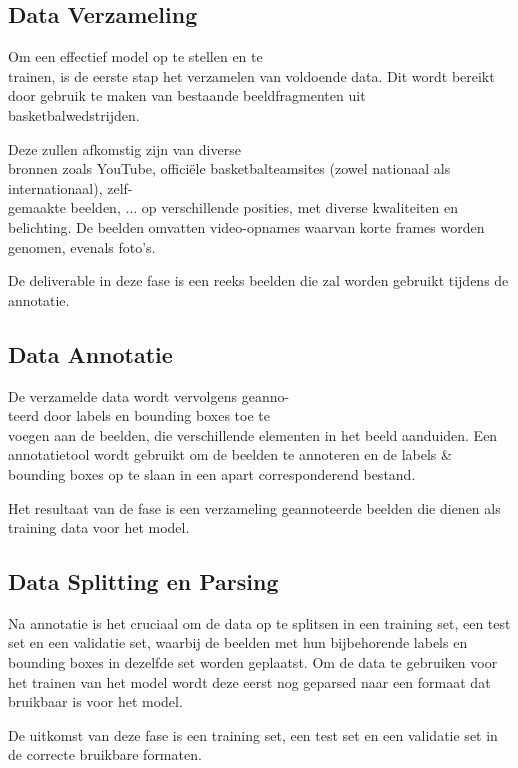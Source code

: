 \subsection{Data Verzameling}
Om een effectief model op te stellen en te \\trainen, is de eerste stap het verzamelen van voldoende data. 
Dit wordt bereikt door gebruik te maken van bestaande beeldfragmenten uit \\basketbalwedstrijden.

Deze zullen afkomstig zijn van diverse \\bronnen zoals YouTube, officiële basketbalteamsites (zowel nationaal als internationaal), zelf-\\gemaakte beelden, $\ldots$ op verschillende posities, met diverse kwaliteiten en belichting. 
De beelden omvatten video-opnames waarvan korte frames worden genomen, evenals foto's.

De deliverable in deze fase is een reeks beelden die zal worden gebruikt tijdens de annotatie.


\subsection{Data Annotatie}
De verzamelde data wordt vervolgens geanno-\\teerd door labels en bounding boxes toe te \\voegen aan de beelden, die verschillende elementen in het beeld aanduiden. 
Een annotatietool wordt gebruikt om de beelden te annoteren en de labels \& bounding boxes op te slaan in een apart corresponderend bestand. 

Het resultaat van de fase is een verzameling geannoteerde beelden die dienen als training data voor het model.


\subsection{Data Splitting en Parsing}
Na annotatie is het cruciaal om de data op te splitsen in een training set, een test set en een validatie set, waarbij de beelden met hun bijbehorende labels en bounding boxes in dezelfde set worden geplaatst. Om de data te gebruiken voor het trainen van het model wordt deze eerst nog geparsed naar een formaat dat bruikbaar is voor het model. 

De uitkomst van deze fase is een training set, een test set en een validatie set in de correcte bruikbare formaten.


